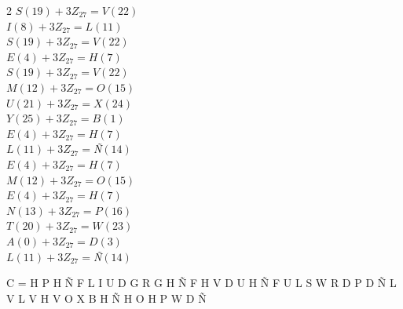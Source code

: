 \documentclass{article}
\begin{document}
\begin{enumerate}
\begin{multicols}{2}
 $S(19)+3 Z_{27}=V (22)$\\
 $I(8)+3 Z_{27}=L (11)$\\ 
 $S(19)+3 Z_{27}=V (22)$\\
 $E(4)+3 Z_{27}=H (7)$\\
 $S(19)+3 Z_{27}=V (22)$\\
 $M(12)+3 Z_{27}=O (15)$\\
 $U(21)+3 Z_{27}=X (24)$\\
 $Y(25)+3 Z_{27}=B (1)$\\
 $E(4)+3 Z_{27}=H (7)$\\
 $L(11)+3 Z_{27}= $\textit{Ñ}$ (14)$\\
 $E(4)+3 Z_{27}=H (7)$\\
 $M(12)+3 Z_{27}=O (15)$\\
 $E(4)+3 Z_{27}=H (7)$\\ 
 $N(13)+3 Z_{27}=P (16)$\\ 
 $T(20)+3 Z_{27}=W (23)$\\ 
 $A(0)+3 Z_{27}=D (3)$\\
 $L(11)+3 Z_{27}= $\textit{Ñ}$ (14)$\\
 \end{multicols}
 
  C = H P H Ñ F L I U D G R G H Ñ F H V D U H Ñ F U L S W R D P D Ñ L V L V H V O X B H Ñ H O H P W D Ñ 
  

\end{enumerate}
\end{document}
